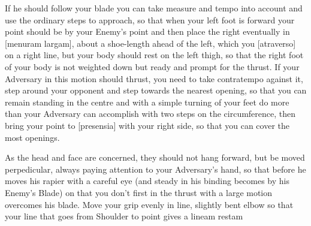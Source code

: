 
If he should follow your blade you can take measure and tempo into
account and use the ordinary steps to approach, so that when your left
foot is forward your point should be by your Enemy's point and then
place the right eventually in [menuram largam], about a shoe-length
ahead of the left, which you [atraverso] on a right
line, but your body should rest on the left thigh, so that the right
foot of your body is not weighted down but ready and prompt for the
thrust. If your Adversary in this motion should thrust, you need to
take contratempo against it, step around your opponent and step
towards the nearest opening, so that you can remain standing in the
centre and with a simple turning of your feet do more than your
Adversary can accomplish with two steps on the circumference, then
bring your point to [presensia] with your right side, so that you can
cover the most openings.


As the head and face are concerned, they should not hang forward, but
be moved perpedicular, always paying attention to your Adversary's
hand, so that before he moves his rapier with a careful eye (and
steady in his binding becomes by his Enemy's Blade) on that you
don't first in the thrust with a large motion overcomes his
blade. Move your grip evenly in line, slightly bent elbow so that your
line that goes from Shoulder to point gives a lineam restam